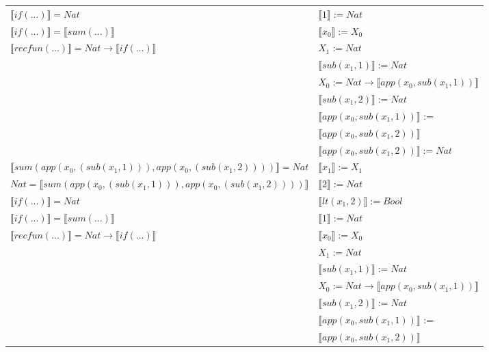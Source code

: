 \begin{exercise}
\begin{description}
\begin{center}
\begin{longtable}[!h]{ | l | l | }
                        $ \llbracket if(...) \rrbracket = Nat$ &   $ \llbracket 1 \rrbracket := Nat$\\ 
                        $ \llbracket if(...) \rrbracket =  \llbracket sum(...) \rrbracket$ & $ \llbracket x_0 \rrbracket := X_0$\\
                        $ \llbracket recfun(...) \rrbracket =   Nat  \to  \llbracket if(...) \rrbracket $ &  $X_1 := Nat$\\
                        &  $ \llbracket sub(x_1,1) \rrbracket := Nat$ \\ 
                        & $X_0 := Nat \to  \llbracket app(x_0, sub(x_1,1)) \rrbracket$\\
			     & $ \llbracket sub(x_1,2) \rrbracket := Nat$ \\
			     & $ \llbracket app(x_0, sub(x_1,1)) \rrbracket$ := \\
			     & $ \llbracket app(x_0, sub(x_1,2)) \rrbracket$\\ 
			     & $ \llbracket app(x_0, sub(x_1,2)) \rrbracket := Nat$ \\
                    \hline 
                        $ \llbracket sum(app(x_0, (sub(x_1,1))), app(x_0, (sub(x_1,2))))  \rrbracket = Nat$ & $ \llbracket x_1 \rrbracket := X_1$\\ 
                        $Nat =  \llbracket sum(app(x_0, (sub(x_1,1))), app(x_0, (sub(x_1,2)))) \rrbracket$ & $ \llbracket 2 \rrbracket := Nat$\\
                        $ \llbracket if(...) \rrbracket = Nat$ & $ \llbracket lt(x_1 , 2) \rrbracket := Bool$\\ 
                        $ \llbracket if(...) \rrbracket =  \llbracket sum(...) \rrbracket$ & $ \llbracket 1 \rrbracket := Nat$\\
                        $ \llbracket recfun(...) \rrbracket =   Nat  \to  \llbracket if(...) \rrbracket $ & $ \llbracket x_0 \rrbracket := X_0$\\
                        &  $X_1 := Nat$\\ 
                        & $ \llbracket sub(x_1,1) \rrbracket := Nat$\\
			     &  $X_0 := Nat \to  \llbracket app(x_0, sub(x_1,1)) \rrbracket$\\
			     & $ \llbracket sub(x_1,2) \rrbracket := Nat$ \\
			     & $ \llbracket app(x_0, sub(x_1,1)) \rrbracket$ := \\
			     & $ \llbracket app(x_0, sub(x_1,2)) \rrbracket$\\ 

\end{longtable}
\end{center}
\end{description}
\end{exercise}
